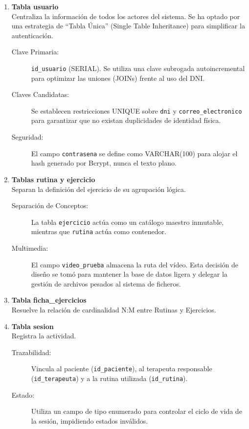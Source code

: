 \begin{enumerate}
    \item \textbf{Tabla usuario} \\
    Centraliza la información de todos los actores del sistema. Se ha optado por una estrategia de ``Tabla Única'' (Single Table Inheritance) para simplificar la autenticación.
    \begin{description}
        \item[Clave Primaria:] \texttt{id\_usuario} (SERIAL). Se utiliza una clave subrogada autoincremental para optimizar las uniones (JOINs) frente al uso del DNI.
        \item[Claves Candidatas:] Se establecen restricciones UNIQUE sobre \texttt{dni} y \texttt{correo\_electronico} para garantizar que no existan duplicidades de identidad física.
        \item[Seguridad:] El campo \texttt{contrasena} se define como VARCHAR(100) para alojar el hash generado por Bcrypt, nunca el texto plano.
    \end{description}

    \item \textbf{Tablas rutina y ejercicio} \\
    Separan la definición del ejercicio de su agrupación lógica.
    \begin{description}
        \item[Separación de Conceptos:] La tabla \texttt{ejercicio} actúa como un catálogo maestro inmutable, mientras que \texttt{rutina} actúa como contenedor.
        \item[Multimedia:] El campo \texttt{video\_prueba} almacena la ruta del vídeo. Esta decisión de diseño se tomó para mantener la base de datos ligera y delegar la gestión de archivos pesados al sistema de ficheros.
    \end{description}

    \item \textbf{Tabla ficha\_ejercicios} \\
    Resuelve la relación de cardinalidad N:M entre Rutinas y Ejercicios.

    \item \textbf{Tabla sesion} \\
    Registra la actividad.
    \begin{description}
        \item[Trazabilidad:] Vincula al paciente (\texttt{id\_paciente}), al terapeuta responsable (\texttt{id\_terapeuta}) y a la rutina utilizada (\texttt{id\_rutina}).
        \item[Estado:] Utiliza un campo de tipo enumerado para controlar el ciclo de vida de la sesión, impidiendo estados inválidos.
    \end{description}


\end{enumerate}
